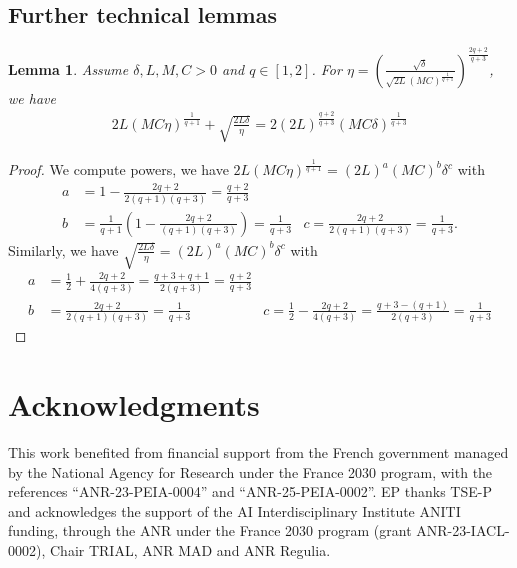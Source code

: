 \documentclass[11pt]{article}
\newtheorem{lemma}{Lemma}[section]
\newcommand{\1}{\mathbbm{1}}
\numberwithin{equation}{section}
\begin{document}
\subsection{Further technical lemmas}
\label{sec:LemmaPowers}

\begin{lemma}
    Assume $\delta,L,M,C > 0$ and $q \in [1,2]$.
	For $\eta = \left(\frac{\sqrt{\delta}}{\sqrt{2L} (M C)^{\frac{1}{q+1}}}\right)^{\frac{2q + 2}{q+3}}$, we have
	\begin{align*}
		2 L( M C\eta)^{\frac{1}{q+1}} + \sqrt{\frac{2L\delta}{\eta}} = 2 (2L)^{\frac{q+2}{q+3}} (MC\delta)^{\frac{1}{q+3}} 
	\end{align*}
\end{lemma}

\begin{proof}
	We compute powers, we have $2 L( M C\eta)^{\frac{1}{q+1}} = (2L)^{a} (MC)^b \delta^c$ with
	\begin{align*}
		a &= 1 -  \frac{2q+2}{2(q+1)(q+3)}= \frac{q+2}{q+3}  \\
		b &= \frac{1}{q+1}\left( 1 - \frac{2q+2}{(q+1)(q+3)} \right) = \frac{1}{q+3} & c = \frac{2q +2 }{2 (q+1) (q+3)} = \frac{1}{q+3}.
	\end{align*}
	Similarly, we have $\sqrt{\frac{2L\delta}{\eta}} = (2L)^{a} (MC)^b \delta^c$ with
	\begin{align*}
		a &= \frac{1}{2} + \frac{2q+2}{4(q+3)} = \frac{q+3 + q+1 }{2(q+3)} = \frac{q+2}{q+3} \\
		b &= \frac{2q+2}{2(q+1)(q+3)} = \frac{1}{q+3}  
		&c = \frac{1}{2} - \frac{2q+2}{4(q+3)} = \frac{q+3 - (q+1)}{2(q+3)} = \frac{1}{q+3} 
	\end{align*}
\end{proof}


\section*{Acknowledgments}
This work benefited from financial support from the French government managed by the National Agency for Research under the France 2030 program, with the references ``ANR-23-PEIA-0004'' and ``ANR-25-PEIA-0002''. EP thanks TSE-P and acknowledges the support of the AI Interdisciplinary Institute ANITI funding, through the ANR under the
France 2030 program (grant ANR-23-IACL-0002), Chair TRIAL, ANR MAD and ANR Regulia. 




\end{document}
